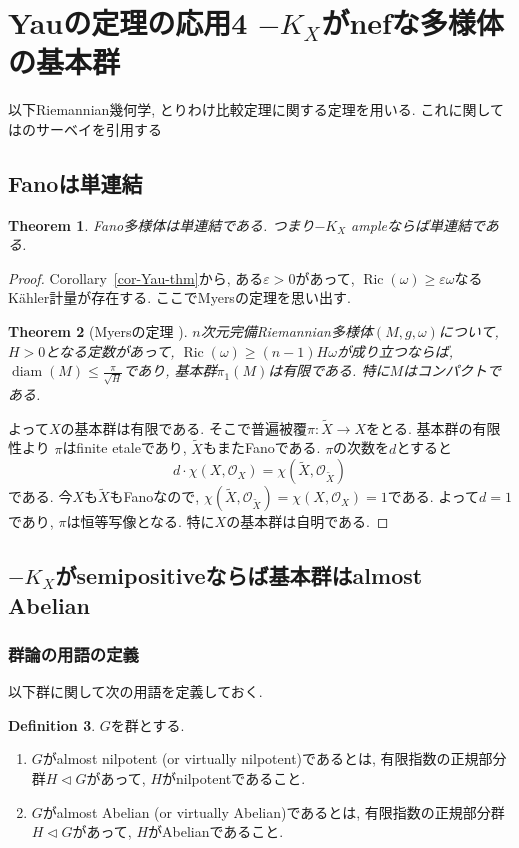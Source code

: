 \documentclass[dvipdfmx,a4paper,11pt]{article} %
\newtheorem{thm}{Theorem}[section]
\theoremstyle{definition}
\newtheorem{defn}[thm]{Definition}
\theoremstyle{remark}
\numberwithin{equation}{section}
\newcommand{\diam}{\operatorname{diam}}
\DeclareMathOperator{\Ric}{Ric}
\begin{document}
 
 \newpage
 
  \section{Yauの定理の応用4 $-K_X$がnefな多様体の基本群}
 以下Riemannian幾何学, とりわけ比較定理に関する定理を用いる. 
 これに関しては\cite{Zhu97}のサーベイを引用する
 \subsection{Fanoは単連結}
\begin{thm}
Fano多様体は単連結である. 
つまり$-K_X$ ampleならば単連結である. 
\end{thm}
\begin{proof}
Corollary~\ref{cor-Yau-thm}から, ある$\varepsilon>0$があって, $\Ric(\omega) \geq \varepsilon \omega$なるK\"ahler計量が存在する.
ここでMyersの定理を思い出す.

\begin{thm}[Myersの定理 {\cite[Theorem 3.4]{Zhu97}}]
$n$次元完備Riemannian多様体$(M,g, \omega)$について, $H>0$となる定数があって, 
$\Ric(\omega) \geq (n-1)H \omega$が成り立つならば, 
$\diam(M) \leq \frac{\pi}{\sqrt{H}}$であり, 基本群$\pi_1(M)$は有限である. 
特に$M$はコンパクトである. 
\end{thm}

よって$X$の基本群は有限である. 
そこで普遍被覆$\pi \colon \widetilde{X} \to X$をとる. 基本群の有限性より
$\pi$はfinite etaleであり, $\widetilde{X}$もまたFanoである. 
$\pi$の次数を$d$とすると
\[
d \cdot \chi(X, \mathcal{O}_X) =  \chi( \widetilde{X}, \mathcal{O}_{\widetilde{X}})
\]
である. 今$X$も$\widetilde{X}$もFanoなので, 
$ \chi( \widetilde{X}, \mathcal{O}_{\widetilde{X}}) = \chi(X, \mathcal{O}_X) =1$である.
よって$d=1$であり, $\pi$は恒等写像となる. 特に$X$の基本群は自明である.  
\end{proof}


 \subsection{$-K_X$がsemipositiveならば基本群はalmost Abelian}
 
 \subsubsection{群論の用語の定義}
 以下群に関して次の用語を定義しておく.
 \begin{defn}
 $G$を群とする.
 \begin{enumerate}
 \item $G$がalmost nilpotent (or virtually nilpotent)であるとは, 有限指数の正規部分群$H \triangleleft G$があって, $H$がnilpotentであること. 
 \item $G$がalmost Abelian (or virtually Abelian)であるとは, 有限指数の正規部分群$H \triangleleft G$があって, $H$がAbelianであること. 
 \end{enumerate}
 \end{defn}
 
\end{document}
